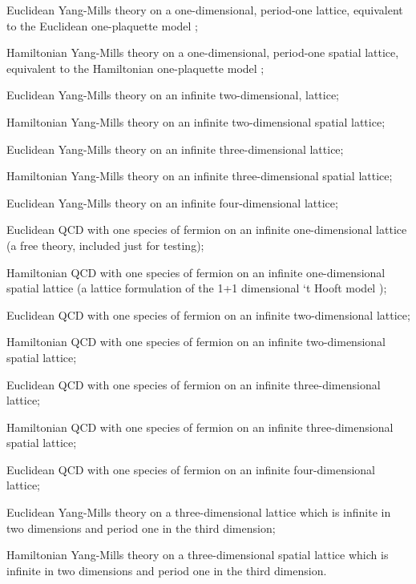 \documentclass [12pt]{article}
\makeatletter
\renewcommand{\tt}{\begingroup\catcode`_=12\def\_{\string_}\tt@}
\newcommand{\tt@}[1]{\texttt{#1}\endgroup}
\makeatother
\begin{document}
\begin{description}\advance\itemsep -6pt
\item [\tt {YM1e}]
    Euclidean Yang-Mills theory on a one-dimensional, period-one lattice,
    equivalent to the Euclidean one-plaquette model
    \cite{Gross:1980he};
\item [\tt {YM1h}]
    Hamiltonian Yang-Mills theory on a one-dimensional, period-one spatial lattice,
    equivalent to the Hamiltonian one-plaquette model
    \cite{Wadia:1980cp,Jevicki:1980zq,Neuberger:1980qh};
\item [\tt {YM2e}]
    Euclidean Yang-Mills theory on an infinite two-dimensional, lattice;
\item [\tt {YM2h}]
    Hamiltonian Yang-Mills theory on an infinite two-dimensional spatial lattice;
\item [\tt {YM3e}]
    Euclidean Yang-Mills theory on an infinite three-dimensional lattice;
\item [\tt {YM3h}]
    Hamiltonian Yang-Mills theory on an infinite three-dimensional spatial lattice;
\item [\tt {YM4e}]
    Euclidean Yang-Mills theory on an infinite four-dimensional lattice;
\item [\tt {QCD1e}]
    Euclidean QCD with one species of fermion on an infinite one-dimensional lattice
    (a free theory, included just for testing);
\item [\tt {QCD1h}]
    Hamiltonian QCD with one species of fermion on an infinite one-dimensional
    spatial lattice
    (a lattice formulation of the 1+1 dimensional `t Hooft model
    \cite{tHooft:1974pnl});
\item [\tt {QCD2e}]
    Euclidean QCD with one species of fermion on an infinite two-dimensional lattice;
\item [\tt {QCD2h}]
    Hamiltonian QCD with one species of fermion on an infinite two-dimensional 
    spatial lattice;
\item [\tt {QCD3e}]
    Euclidean QCD with one species of fermion on an infinite three-dimensional lattice;
\item [\tt {QCD3h}]
    Hamiltonian QCD with one species of fermion on an infinite three-dimensional 
    spatial lattice;
\item [\tt {QCD4e}]
    Euclidean QCD with one species of fermion on an infinite four-dimensional lattice;
\item [\tt {YM3ep}]
    Euclidean Yang-Mills theory on a three-dimensional lattice
    which is infinite in two dimensions and period one in the third dimension;
\item [\tt {YM3hp}]
    Hamiltonian Yang-Mills theory on a three-dimensional spatial lattice
    which is infinite in two dimensions and period one in the third dimension.
\end{description}
\end{document}
